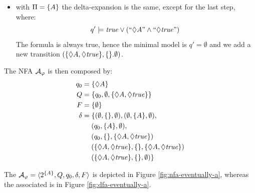 \begin{example}
\begin{enumerate}
\begin{itemize}
			\item with $\Pi = \{A\}$ the delta-expansion is the same, except for the last step, where:
			\[
			q' \models \mathit{true} \vee ( ``\Diamond A" \wedge ``\Diamond \mathit{true}")\
			\]
			The formula is always true, hence the minimal model is $q'=\emptyset$ and we add a new transition $(\{\Diamond A, \Diamond \mathit{true}\}, \{\}. \emptyset)$. 
			
		\end{itemize}
	
	The NFA $\mathcal{A}_\varphi$ is then composed by:
	\begin{align*}
	q_0 &= \{\Diamond A\}		\\
	Q &= \{q_0, \emptyset, \{\Diamond A, \Diamond \mathit{true}\}\}  \\
	F &= \{\emptyset\}  \\
	\delta &= \{(\emptyset, \{\}, \emptyset), (\emptyset, \{A\}, \emptyset),\\
		&\hspace*{.18in} (q_0, \{A\}, \emptyset),\\
		&\hspace*{.18in} (q_0, \{\}, \{\Diamond A, \Diamond \mathit{true}\})\\
		&\hspace*{.18in} (\{\Diamond A, \Diamond \mathit{true}\}, \{\}, \{\Diamond A, \Diamond \mathit{true}\})\\
		&\hspace*{.18in} (\{\Diamond A, \Diamond \mathit{true}\}, \{\}, \emptyset)\}
	\end{align*}
	\end{enumerate}
	
	The \NFA $\mathcal{A}_\varphi = \langle 2^{\{A\}}, Q, q_0, \delta, F \rangle$ is depicted in Figure \ref{fig:nfa-eventually-a}, whereas the associated \DFA is in Figure \ref{fig:dfa-eventually-a}.
	

\end{example}
